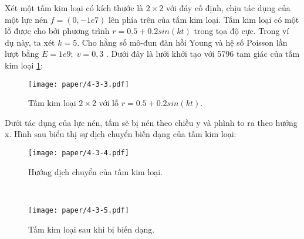 \documentclass[
12pt, %
oneside, %
english, %
onehalfspacing, %
nolistspacing, %
headsepline, %
addchap,
]{MastersDoctoralThesis} %
\begin{document}
Xét một tấm kim loại có kích thước là $2 \times 2$ với đáy cố định, chịu tác dụng của một lực nén $f = (0,-1e7)$ lên phía trên của tấm kim loại. Tấm kim loại có một lỗ được cho bởi phương trình $r = 0.5 + 0.2 sin(kt)$ trong tọa độ cực. Trong ví dụ này, ta xét $k=5$. Cho hằng số mô-đun đàn hồi Young và hệ số Poisson lần lượt bằng $E=1e9;\; v=0,3$ \citep{HUI-2011}. Dưới đây là lưới khởi tạo với 5796 tam giác của tấm kim loại \ref{fig:exam33}:\\

\begin{figure}[http]
\centering
\texttt{[image: paper/4-3-3.pdf]}
\caption{Tấm kim loại $2 \times 2$ với lỗ $r = 0.5 + 0.2 sin(kt)$.}
\label{fig:exam33}
\end{figure}
Dưới tác dụng của lực nén, tấm sẽ bị nén theo chiều y và phình to ra theo hướng x. Hình sau biểu thị sự dịch chuyển biến dạng của tấm kim loại:\\
\begin{figure}[http]
\centering
\texttt{[image: paper/4-3-4.pdf]}
\caption{Hướng dịch chuyển của tấm kim loại.}
\label{fig:exam34}
\end{figure}\\
\begin{figure}[http]
\centering
\texttt{[image: paper/4-3-5.pdf]}
\caption{Tấm kim loại sau khi bị biến dạng.}
\label{fig:exam35}
\end{figure}\\
\end{document}
